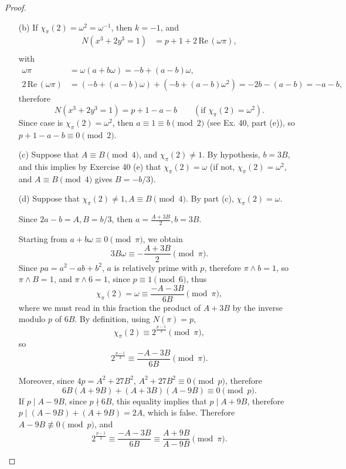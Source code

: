 \documentclass[11pt,a4paper]{article}
\newcommand{\re}{\,\mathrm{Re}\,}
\begin{document}
\begin{proof}
\begin{enumerate}
(b) If $\chi_\pi(2) = \omega^2 = \omega^{-1}$, then $k=-1$, and
\begin{align*}
N(x^3 + 2 y^3 = 1)&= p+1+ 2 \re(\omega \pi),\\
\end{align*}
with 
\begin{align*}
\omega \pi &= \omega (a + b \omega) = -b + (a-b)\omega,\\
2 \re(\omega \pi) &= (-b + (a-b) \omega) +( -b + (a-b)\omega^2) = -2b - (a-b) = -a -b,
\end{align*}
therefore
$$N(x^3 + 2y^3 = 1) = p+1 -a-b \qquad (\text {if }\chi_\pi(2) = \omega^2).$$
Since case is $\chi_\pi(2) = \omega^2$, then $a \equiv 1 \equiv b \pmod 2$ (see Ex. 40, part (e)), so $p + 1 -a -b\equiv 0 \pmod 2$.

\item[(c)] Suppose that $A\equiv B \pmod 4$, and $\chi_\pi(2)\ne 1$. By hypothesis, $b = 3B$, and this implies by Exercise 40 (e) that $\chi_\pi(2) = \omega$ (if not, $\chi_\pi(2) = \omega^2$, and $A\equiv B \pmod 4$ gives $B = -b/3$).

\item[(d)] Suppose that $\chi_\pi(2) \ne 1, A\equiv B \pmod 4$. By part (c), $\chi_\pi(2) = \omega$.

Since $2a-b = A, B = b/3$, then $a = \frac{A+3B}{2}, b = 3B$.

Starting from $a + b \omega \equiv 0 \pmod \pi$, we obtain
$$ 3B \omega \equiv -\frac{A+3B}{2} \pmod \pi.$$
Since $pa = a^2 - ab + b^2$, $a$ is relatively prime with $p$, therefore $\pi \wedge b = 1$, so $\pi \wedge B = 1$, and $\pi \wedge 6 = 1$, since $p \equiv 1 \pmod 6$, thus
$$\chi_\pi(2)  = \omega \equiv \frac{-A-3B}{6B} \pmod \pi,$$
where we must read in this fraction the product of $A + 3B$ by the inverse modulo $p$ of $6B$.
By definition, using $N(\pi) = p$, 
$$\chi_\pi(2) \equiv 2^\frac{p-1}{3} \pmod \pi,$$
so
$$2^{\frac{p-1}{3}} \equiv \frac{-A-3B}{6B}  \pmod \pi.$$

Moreover, since  $4p = A^2 + 27 B^2$, $A^2 + 27 B^2 \equiv 0 \pmod p$, therefore
$$ 6B(A+9B) + (A+3B)(A-9B) \equiv 0 \pmod p.$$
If $p \mid A-9B$, since $p \nmid 6B$, this equality implies that $p\mid A+9B$, therefore $p \mid (A-9B) + (A+9B) = 2A$, which is false. Therefore $A-9B \not \equiv 0 \pmod p$, and
$$2^{\frac{p-1}{3}} \equiv \frac{-A-3B}{6B}  \equiv \frac{A+9B}{A-9B} \pmod \pi.$$
\end{enumerate}

\end{proof}
\end{document}

